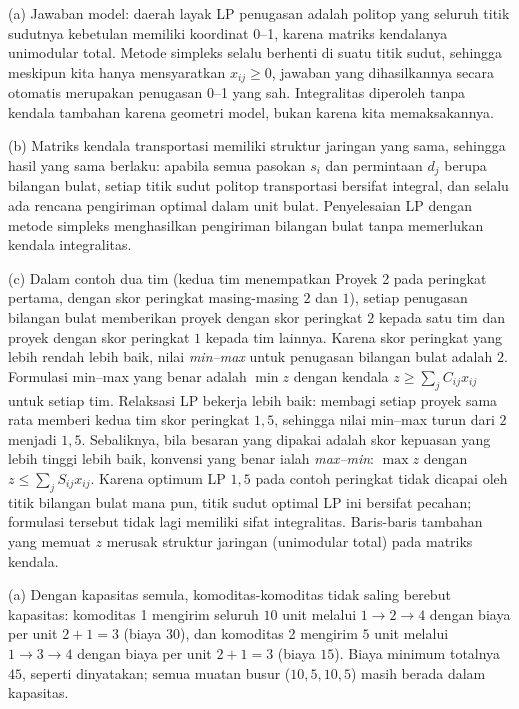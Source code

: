 
(a) Jawaban model: daerah layak LP penugasan adalah politop yang seluruh titik sudutnya kebetulan memiliki koordinat 0--1, karena matriks kendalanya unimodular total. Metode simpleks selalu berhenti di suatu titik sudut, sehingga meskipun kita hanya mensyaratkan $x_{ij} \geq 0$, jawaban yang dihasilkannya secara otomatis merupakan penugasan 0--1 yang sah. Integralitas diperoleh tanpa kendala tambahan karena geometri model, bukan karena kita memaksakannya.

(b) Matriks kendala transportasi memiliki struktur jaringan yang sama, sehingga hasil yang sama berlaku: apabila semua pasokan $s_i$ dan permintaan $d_j$ berupa bilangan bulat, setiap titik sudut politop transportasi bersifat integral, dan selalu ada rencana pengiriman optimal dalam unit bulat. Penyelesaian LP dengan metode simpleks menghasilkan pengiriman bilangan bulat tanpa memerlukan kendala integralitas.

(c) Dalam contoh dua tim (kedua tim menempatkan Proyek 2 pada peringkat pertama, dengan skor peringkat masing-masing $2$ dan $1$), setiap penugasan bilangan bulat memberikan proyek dengan skor peringkat $2$ kepada satu tim dan proyek dengan skor peringkat $1$ kepada tim lainnya. Karena skor peringkat yang lebih rendah lebih baik, nilai \emph{min--max} untuk penugasan bilangan bulat adalah $2$. Formulasi min--max yang benar adalah $\min z$ dengan kendala $z \geq \sum_j C_{ij}x_{ij}$ untuk setiap tim. Relaksasi LP bekerja lebih baik: membagi setiap proyek sama rata memberi kedua tim skor peringkat $1{,}5$, sehingga nilai min--max turun dari $2$ menjadi $1{,}5$. Sebaliknya, bila besaran yang dipakai adalah skor kepuasan yang lebih tinggi lebih baik, konvensi yang benar ialah \emph{max--min}: $\max z$ dengan $z \leq \sum_j S_{ij}x_{ij}$. Karena optimum LP $1{,}5$ pada contoh peringkat tidak dicapai oleh titik bilangan bulat mana pun, titik sudut optimal LP ini bersifat pecahan; formulasi tersebut tidak lagi memiliki sifat integralitas. Baris-baris tambahan yang memuat $z$ merusak struktur jaringan (unimodular total) pada matriks kendala.


(a) Dengan kapasitas semula, komoditas-komoditas tidak saling berebut kapasitas: komoditas 1 mengirim seluruh $10$ unit melalui $1 \to 2 \to 4$ dengan biaya per unit $2 + 1 = 3$ (biaya $30$), dan komoditas 2 mengirim $5$ unit melalui $1 \to 3 \to 4$ dengan biaya per unit $2 + 1 = 3$ (biaya $15$). Biaya minimum totalnya $45$, seperti dinyatakan; semua muatan busur ($10, 5, 10, 5$) masih berada dalam kapasitas.

